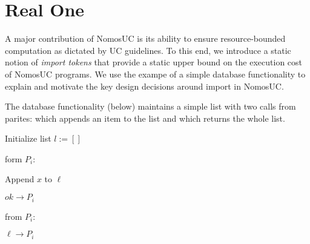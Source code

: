 \section{Real One}
A major contribution of NomosUC is its ability to ensure resource-bounded computation
as dictated by UC guidelines.
To this end, we introduce a static notion of \emph{import tokens} that provide a static upper
bound on the execution cost of NomosUC programs.
We use the exampe of a simple database functionality to explain and motivate the key design decisions around import in NomosUC.

The database functionality \Fdb (below) maintains a simple list with two calls from parites:  which appends an item to the list and  which returns the whole list. 
\begin{bbox}[title={Functionality $\F_{\msf{db}}$}]

Initialize list $l := []$

\OnInput {} form $P_i$:
    \begin{ritemize}
        \item Append $x$ to $\ell$
        \item \Send $ok \rightarrow P_i$
    \end{ritemize}

\OnInput {}from $P_i$:
    \begin{ritemize}
        \item \Send $\ell \rightarrow P_i$
    \end{ritemize}
\end{bbox}

